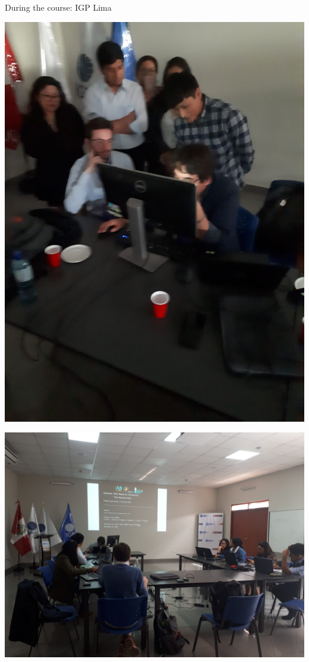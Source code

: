 \documentclass{beamer}
\begin{document}
\begin{frame}
 
 {During the course: IGP Lima}
 
 \begin{minipage}{0.45\linewidth}
   \includegraphics[width=1\linewidth]{images/Lima2}
 \end{minipage}
 \begin{minipage}{0.45\linewidth}
   \includegraphics[width=1\linewidth]{images/Lima3}
 \end{minipage}

 
\end{frame}
\end{document}
